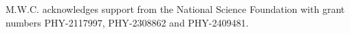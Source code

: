 \documentclass[twocolumn]{aastex631}
\begin{document}
M.W.C. acknowledges support from the National Science Foundation with grant numbers PHY-2117997, PHY-2308862 and PHY-2409481.






\label{lastpage}
\end{document}
